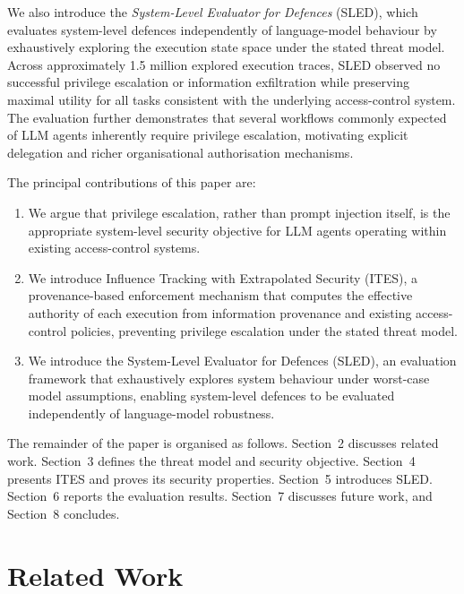 \documentclass{article} %
\begin{document}
We also introduce the \emph{System-Level Evaluator for Defences} (SLED), which evaluates system-level defences independently of language-model behaviour by exhaustively exploring the execution state space under the stated threat model. Across approximately 1.5 million explored execution traces, SLED observed no successful privilege escalation or information exfiltration while preserving maximal utility for all tasks consistent with the underlying access-control system. The evaluation further demonstrates that several workflows commonly expected of LLM agents inherently require privilege escalation, motivating explicit delegation and richer organisational authorisation mechanisms.

The principal contributions of this paper are:

\begin{enumerate}
    \item We argue that privilege escalation, rather than prompt injection itself, is the appropriate system-level security objective for LLM agents operating within existing access-control systems.

    \item We introduce Influence Tracking with Extrapolated Security (ITES), a provenance-based enforcement mechanism that computes the effective authority of each execution from information provenance and existing access-control policies, preventing privilege escalation under the stated threat model.

    \item We introduce the System-Level Evaluator for Defences (SLED), an evaluation framework that exhaustively explores system behaviour under worst-case model assumptions, enabling system-level defences to be evaluated independently of language-model robustness.
\end{enumerate}

The remainder of the paper is organised as follows. Section~2 discusses related work. Section~3 defines the threat model and security objective. Section~4 presents ITES and proves its security properties. Section~5 introduces SLED. Section~6 reports the evaluation results. Section~7 discusses future work, and Section~8 concludes.








\section{Related Work}
\end{document}
